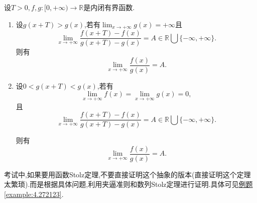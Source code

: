 \documentclass[../../main.tex]{subfiles}%
\begin{document}
\begin{theorem}[函数Stolz定理]\label{theorem:函数Stolz定理}
设\(T > 0,f,g:[0,+\infty)\to\mathbb{R}\)是内闭有界函数.
\begin{enumerate}[(1)]
\item 设\(g(x + T)>g(x)\),若有\(\lim_{x\rightarrow +\infty}g(x)=+\infty\)且
\[
\lim_{x\rightarrow +\infty}\frac{f(x + T)-f(x)}{g(x + T)-g(x)}=A\in\mathbb{R}\bigcup\{-\infty,+\infty\}.
\]
则有
\[
\lim_{x\rightarrow +\infty}\frac{f(x)}{g(x)}=A.
\]

\item 设\(0 < g(x + T)<g(x)\),若有
\[
\lim_{x\rightarrow +\infty}f(x)=\lim_{x\rightarrow +\infty}g(x)=0,
\]
且
\[
\lim_{x\rightarrow +\infty}\frac{f(x + T)-f(x)}{g(x + T)-g(x)}=A\in\mathbb{R}\bigcup\{-\infty,+\infty\}.
\]

则有
\[
\lim_{x\rightarrow +\infty}\frac{f(x)}{g(x)}=A.
\]
\end{enumerate}
\end{theorem}
\begin{remark}
考试中,如果要用函数Stolz定理,不要直接证明这个抽象的版本(直接证明这个定理太繁琐).而是根据具体问题,利用夹逼准则和数列Stolz定理进行证明.具体可见\hyperref[example:4.272123]{例题\ref{example:4.272123}}.
\end{remark}
\end{document}
